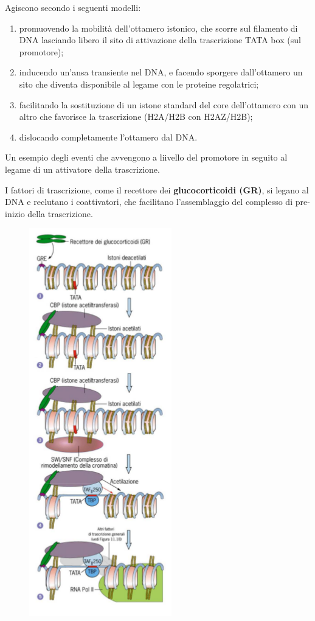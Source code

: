 \documentclass[11pt]{book}
\begin{document}
Agiscono secondo i seguenti modelli:

\begin{enumerate}
\def\labelenumi{\arabic{enumi}.}
\itemsep1pt\parskip0pt
\item
  promuovendo la mobilità dell'ottamero istonico, che scorre sul
  filamento di DNA lasciando libero il sito di attivazione della
  trascrizione TATA box (sul promotore);
\item
  inducendo un'ansa transiente nel DNA, e facendo sporgere dall'ottamero
  un sito che diventa disponibile al legame con le proteine regolatrici;
\item
  facilitando la sostituzione di un istone standard del core
  dell'ottamero con un altro che favorisce la trascrizione (H2A/H2B con
  H2AZ/H2B);
\item
  dislocando completamente l'ottamero dal DNA.
\end{enumerate}

Un esempio degli eventi che avvengono a liivello del promotore in
seguito al legame di un attivatore della trascrizione.

I fattori di trascrizione, come il recettore dei \textbf{glucocorticoidi
(GR)}, si legano al DNA e reclutano i coattivatori, che facilitano
l'assemblaggio del complesso di pre-inizio della trascrizione.

\begin{figure}[htp]
\centering
\includegraphics[scale=1.00]{img/41_Glucocorticoidi.png}
\caption{}
\label{glucocorticoidi1}
\end{figure}
\end{document}
